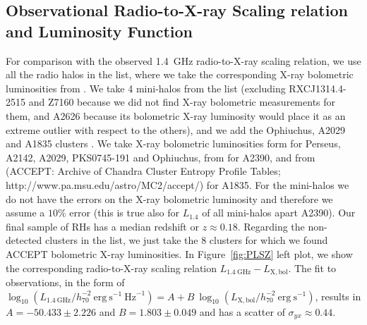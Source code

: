 \documentclass[traditabstract]{aa}
\newcommand{\rmn}{\mathrm}
\begin{document}
\begin{appendix}

\section{Observational Radio-to-X-ray Scaling relation and Luminosity Function}
\label{app:D}

For comparison with the observed 1.4~GHz radio-to-X-ray scaling relation, we use all the radio halos in the \cite{2011A&A...527A..99E} list, where we take the corresponding X-ray bolometric luminosities from \cite{2009A&A...507..661B}. We take 4 mini-halos from the \cite{2011A&A...527A..99E} list (excluding RXCJ1314.4-2515 and Z7160 because we did not find X-ray bolometric measurements for them, and A2626 because its bolometric X-ray luminosity would place it as an extreme outlier with respect to the others), and we add the Ophiuchus, A2029 and A1835 clusters \citep{2009A&A...499..371G}. We take X-ray bolometric luminosities form \cite{2002ApJ...567..716R} for Perseus, A2142, A2029,  PKS0745-191 and Ophiuchus, from \cite{Boehringer:1998vv} for A2390, and from \cite{2009ApJS..182...12C} (ACCEPT: Archive of Chandra Cluster Entropy Profile Tables; http://www.pa.msu.edu/astro/MC2/accept/) for A1835. For the mini-halos we do not have the errors on the X-ray bolometric luminosity and therefore we assume a $10\%$ error (this is true also for $L_{1.4}$ of all mini-halos apart A2390). Our final sample of RHs has a median redshift or $z\approx0.18$. Regarding the non-detected clusters in the \cite{2011A&A...527A..99E} list, we just take the 8 clusters for which we found ACCEPT bolometric X-ray luminosities. In Figure~\ref{fig:PLSZ} left plot, we show the corresponding radio-to-X-ray scaling relation $L_{1.4~\rmn{GHz}}-L_{\rmn{X,bol}}$. The fit to observations, in the form of $\log_{10} (L_{1.4~\rmn{GHz}}/h_{70}^{-2}~\rmn{erg}~\rmn{s}^{-1}~\rmn{Hz}^{-1}) = A + B~\log_{10} (L_{ \rmn{X,bol}}/h_{70}^{-2}~\rmn{erg}~\rmn{s}^{-1})$, results in $A=-50.433\pm2.226$ and $B=1.803\pm0.049$ and has a scatter of $\sigma_{yx} \approx 0.44$. 


\end{appendix}
\end{document}
